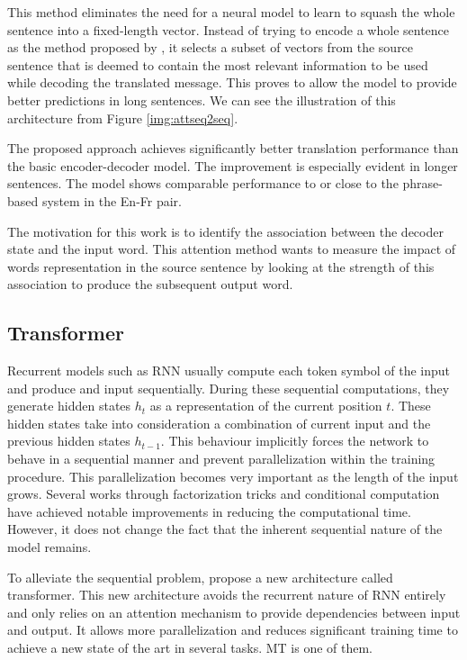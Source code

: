 This method eliminates the need for a neural model to learn to squash the whole sentence into a fixed-length vector. Instead of trying to encode a whole sentence as the method proposed by \cite{sutskever2014sequence}, it selects a subset of vectors from the source sentence that is deemed to contain the most relevant information to be used while decoding the translated message. This proves to allow the model to provide better predictions in long sentences. We can see the illustration of this architecture from Figure \ref{img:attseq2seq}.


The proposed approach achieves significantly better translation performance than the basic encoder-decoder model. The improvement is especially evident in longer sentences. The model shows comparable performance to or close to the phrase-based system in the En-Fr pair.

The motivation for this work is to identify the association between the decoder state and the input word. This attention method wants to measure the impact of words representation in the source sentence by looking at the strength of this association to produce the subsequent output word.

\subsection{Transformer}
Recurrent models such as RNN usually compute each token symbol of the input and produce and input sequentially. During these sequential computations, they generate hidden states $h_t$ as a representation of the current position $t$. These hidden states take into consideration a combination of current input and the previous hidden states $h_{t-1}$. This behaviour implicitly forces the network to behave in a sequential manner and prevent parallelization within the training procedure. This parallelization becomes very important as the length of the input grows. Several works through factorization tricks \cite{Kuchaiev2017FactorizationTF} and conditional computation \cite{Shazeer2017OutrageouslyLN} have achieved notable improvements in reducing the computational time. However, it does not change the fact that the inherent sequential nature of the model remains.

To alleviate the sequential problem, \cite{vaswani2017attention} propose a new architecture called transformer. This new architecture avoids the recurrent nature of RNN entirely and only relies on an attention mechanism to provide dependencies between input and output. It allows more parallelization and reduces significant training time to achieve a new state of the art in several tasks. MT is one of them.

